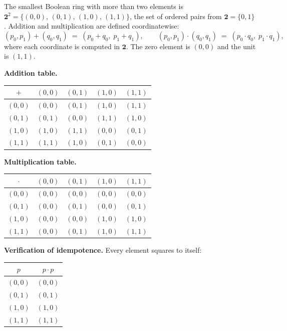 \begin{example*}
\label{ex:boolean-ring-four-elements}
The smallest Boolean ring with more than two elements is
$\mathbf{2}^2 = \{(0,0),\,(0,1),\,(1,0),\,(1,1)\}$,
the set of ordered pairs from $\mathbf{2} = \{0,1\}$.
Addition and multiplication are defined coordinatewise:
\[
  (p_0,p_1) + (q_0,q_1) \;=\; (p_0+q_0,\;p_1+q_1),
  \qquad
  (p_0,p_1) \cdot (q_0,q_1) \;=\; (p_0 \cdot q_0,\;p_1 \cdot q_1),
\]
where each coordinate is computed in $\mathbf{2}$.
The zero element is $(0,0)$ and the unit is $(1,1)$.

\medskip
\noindent\textbf{Addition table.}
\begin{center}
\renewcommand{\arraystretch}{1.25}
\begin{tabular}{c|cccc}
$+$     & $(0,0)$ & $(0,1)$ & $(1,0)$ & $(1,1)$ \\ \hline
$(0,0)$ & $(0,0)$ & $(0,1)$ & $(1,0)$ & $(1,1)$ \\
$(0,1)$ & $(0,1)$ & $(0,0)$ & $(1,1)$ & $(1,0)$ \\
$(1,0)$ & $(1,0)$ & $(1,1)$ & $(0,0)$ & $(0,1)$ \\
$(1,1)$ & $(1,1)$ & $(1,0)$ & $(0,1)$ & $(0,0)$
\end{tabular}
\end{center}

\medskip
\noindent\textbf{Multiplication table.}
\begin{center}
\renewcommand{\arraystretch}{1.25}
\begin{tabular}{c|cccc}
$\cdot$ & $(0,0)$ & $(0,1)$ & $(1,0)$ & $(1,1)$ \\ \hline
$(0,0)$ & $(0,0)$ & $(0,0)$ & $(0,0)$ & $(0,0)$ \\
$(0,1)$ & $(0,0)$ & $(0,1)$ & $(0,0)$ & $(0,1)$ \\
$(1,0)$ & $(0,0)$ & $(0,0)$ & $(1,0)$ & $(1,0)$ \\
$(1,1)$ & $(0,0)$ & $(0,1)$ & $(1,0)$ & $(1,1)$
\end{tabular}
\end{center}

\medskip
\noindent\textbf{Verification of idempotence.}
Every element squares to itself:
\begin{center}
\renewcommand{\arraystretch}{1.2}
\begin{tabular}{cc}
\toprule
$p$     & $p \cdot p$ \\ \midrule
$(0,0)$ & $(0,0)$     \\
$(0,1)$ & $(0,1)$     \\
$(1,0)$ & $(1,0)$     \\
$(1,1)$ & $(1,1)$     \\ \bottomrule
\end{tabular}
\end{center}


\end{example*}
